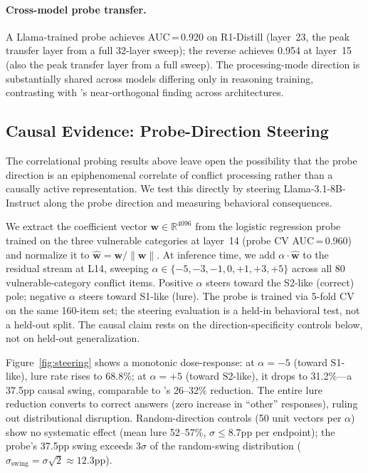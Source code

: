 \documentclass{article}
\newcommand{\sone}{S1-like}
\newcommand{\stwo}{S2-like}
\begin{document}
\paragraph{Cross-model probe transfer.}
A Llama-trained probe achieves AUC\,=\,0.920 on R1-Distill (layer~23, the peak transfer layer from a full 32-layer sweep); the reverse achieves 0.954 at layer~15 (also the peak transfer layer from a full sweep).  The processing-mode direction is substantially shared across models differing only in reasoning training, contrasting with \citet{huang2026cogbias}'s near-orthogonal finding across architectures.

\subsection{Causal Evidence: Probe-Direction Steering}
\label{sec:steering}

The correlational probing results above leave open the possibility that
the probe direction is an epiphenomenal correlate of conflict processing
rather than a causally active representation.  We test this directly by
steering Llama-3.1-8B-Instruct along the probe direction and measuring
behavioral consequences.

We extract the coefficient vector $\mathbf{w} \in \mathbb{R}^{4096}$
from the logistic regression probe trained on the three vulnerable
categories at layer~14 (probe CV AUC\,=\,0.960) and normalize it to
$\hat{\mathbf{w}} = \mathbf{w} / \|\mathbf{w}\|$.  At inference time, we
add $\alpha \cdot \hat{\mathbf{w}}$ to the residual stream at L14,
sweeping $\alpha \in \{-5, -3, -1, 0, +1, +3, +5\}$ across all 80
vulnerable-category conflict items.  Positive $\alpha$ steers toward the
\stwo{} (correct) pole; negative $\alpha$ steers toward \sone{} (lure).
The probe is trained via 5-fold CV on the same 160-item set; the steering
evaluation is a held-in behavioral test, not a held-out split.  The causal
claim rests on the direction-specificity controls below, not on held-out
generalization.

Figure~\ref{fig:steering} shows a monotonic dose-response: at $\alpha = -5$ (toward \sone{}), lure rate rises to 68.8\%; at $\alpha = +5$ (toward \stwo{}), it drops to 31.2\%---a 37.5pp causal swing, comparable to \citet{huang2026cogbias}'s 26--32\% reduction.  The entire lure reduction converts to correct answers (zero increase in ``other'' responses), ruling out distributional disruption.  Random-direction controls (50 unit vectors per $\alpha$) show no systematic effect (mean lure 52--57\%, $\sigma \leq 8.7$pp per endpoint); the probe's 37.5pp swing exceeds $3\sigma$ of the random-swing distribution ($\sigma_{\text{swing}} = \sigma\sqrt{2} \approx 12.3$pp).
\end{document}
